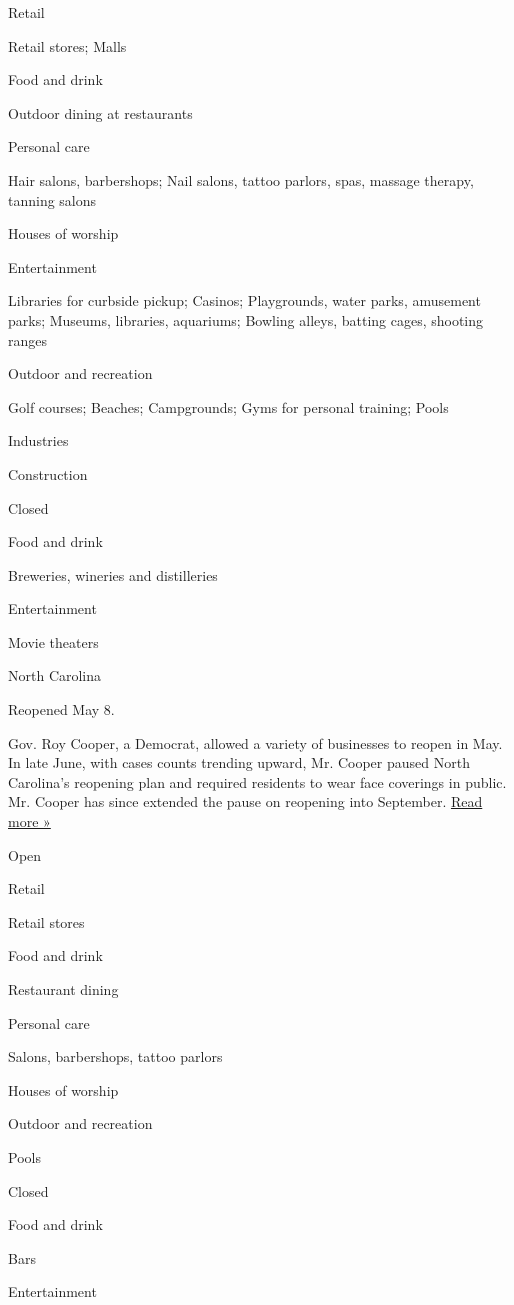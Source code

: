 Retail

Retail stores; Malls

Food and drink

Outdoor dining at restaurants

Personal care

Hair salons, barbershops; Nail salons, tattoo parlors, spas, massage
therapy, tanning salons

Houses of worship

Entertainment

Libraries for curbside pickup; Casinos; Playgrounds, water parks,
amusement parks; Museums, libraries, aquariums; Bowling alleys, batting
cages, shooting ranges

Outdoor and recreation

Golf courses; Beaches; Campgrounds; Gyms for personal training; Pools

Industries

Construction

Closed

Food and drink

Breweries, wineries and distilleries

Entertainment

Movie theaters

North Carolina

Reopened May 8.

Gov. Roy Cooper, a Democrat, allowed a variety of businesses to reopen
in May. In late June, with cases counts trending upward, Mr. Cooper
paused North Carolina's reopening plan and required residents to wear
face coverings in public. Mr. Cooper has since extended the pause on
reopening into September.
\href{https://www.newsobserver.com/news/coronavirus/article244737227.html}{Read
more »}

Open

Retail

Retail stores

Food and drink

Restaurant dining

Personal care

Salons, barbershops, tattoo parlors

Houses of worship

Outdoor and recreation

Pools

Closed

Food and drink

Bars

Entertainment

